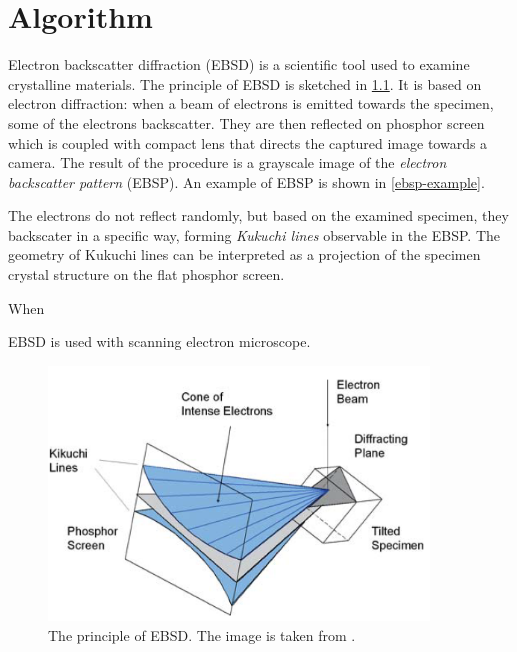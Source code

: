 \chapter{Algorithm}



Electron backscatter diffraction (EBSD) is a scientific tool used to examine crystalline materials. The principle of EBSD is sketched in \cref{ebsd-principle}. It is based on electron diffraction: when a beam of electrons is emitted towards the specimen, some of the electrons backscatter. They are then reflected on phosphor screen which is coupled with compact lens that directs the captured image towards a camera. The result of the procedure is a grayscale image of the \emph{electron backscatter pattern} (EBSP). An example of EBSP is shown in \cref{ebsp-example}.

The electrons do not reflect randomly, but based on the examined specimen, they backscater in a specific way, forming \emph{Kukuchi lines} observable in the EBSP. The geometry of Kukuchi lines can be interpreted as a projection of the specimen crystal structure on the flat phosphor screen.

When 


EBSD is used with scanning electron microscope. 

\begin{figure}
	\centering
	\includegraphics[width=0.9\textwidth]{img/ebsd_principle}
	\caption{The principle of EBSD. The image is taken from \cite{schwartz2009electron}.}
	\label{ebsd-principle}
\end{figure}

